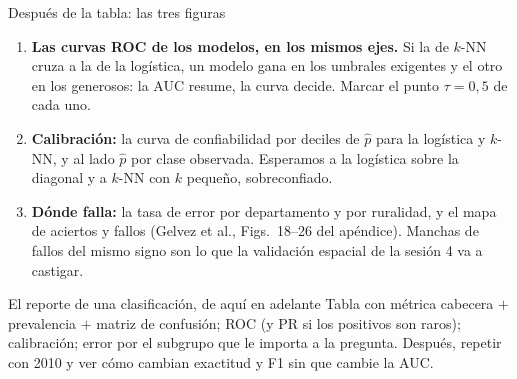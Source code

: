 \documentclass{beamer}
\newcommand{\1}{\mathbb{I}}
\begin{document}
\begin{frame}{Después de la tabla: las tres figuras}
\small
\begin{enumerate}\itemsep6pt
  \item \textbf{Las curvas ROC de los modelos, en los mismos ejes.} Si la de $k$-NN cruza a la de la logística, un modelo gana en los umbrales exigentes y el otro en los generosos: la AUC resume, la curva decide. Marcar el punto $\tau = 0{,}5$ de cada uno. \pause
  \item \textbf{Calibración:} la curva de confiabilidad por deciles de $\hat{p}$ para la logística y $k$-NN, y al lado $\hat{p}$ por clase observada. Esperamos a la logística sobre la diagonal y a $k$-NN con $k$ pequeño, sobreconfiado. \pause
  \item \textbf{Dónde falla:} la tasa de error por departamento y por ruralidad, y el mapa de aciertos y fallos (Gelvez et al., Figs.\ 18--26 del apéndice). Manchas de fallos del mismo signo son lo que la validación espacial de la sesión 4 va a castigar.
\end{enumerate}
\pause
\vspace{0.1cm}
\begin{block}{El reporte de una clasificación, de aquí en adelante}
Tabla con métrica cabecera $+$ prevalencia $+$ matriz de confusión; ROC (y PR si los positivos son raros); calibración; error por el subgrupo que le importa a la pregunta. Después, repetir con 2010 y ver cómo cambian exactitud y F1 sin que cambie la AUC.
\end{block}
\end{frame}
\end{document}
